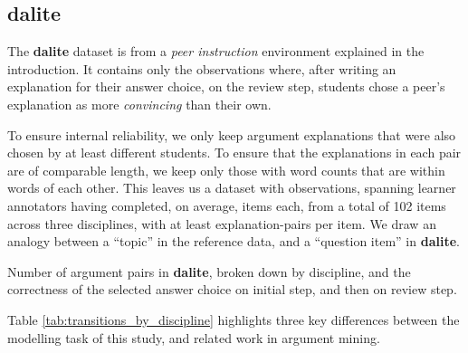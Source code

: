 \documentclass[runningheads]{llncs}
\begin{document}
\subsection{dalite}
The \textbf{dalite} dataset is from a \textit{peer instruction} environment 
explained in the introduction.
It contains only the observations where, after writing an explanation for their 
answer choice, on the review step, students chose a peer's explanation as more 
\textit{convincing} than their own.  

To ensure internal reliability, we only keep argument explanations that were 
also chosen by at least different 
students. 
To ensure that the explanations in each pair are of comparable length, we keep 
only those with word counts that are within 
words of each other. 
This leaves us a dataset with observations, 
spanning  learner annotators having 
completed, on average, 
 items each, from a total of 
%
102 items across three disciplines, 
with at least 
explanation-pairs 
per item.
We draw an analogy between a ``topic'' in the reference data, and a 
``question item'' in \textbf{dalite}.


\begin{table}
	\caption{Number of argument pairs in \textbf{dalite}, broken down by 
	discipline, and the 
	correctness of the selected answer choice on initial step, and then on 
	review step.}
	
	\centerline{}
	
	\label{tab:transitions_by_discipline}
\end{table}

Table \ref{tab:transitions_by_discipline} highlights three key differences 
between the modelling task of this study, and related work in argument mining. 
\end{document}
